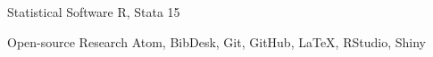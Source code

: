 

\begin{cvskills}

  \cvskill
    {Statistical Software} %
    {R, Stata 15} %

  \cvskill
    {Open-source Research} %
    {Atom, BibDesk, Git, GitHub, LaTeX, RStudio, Shiny} %
\end{cvskills}
